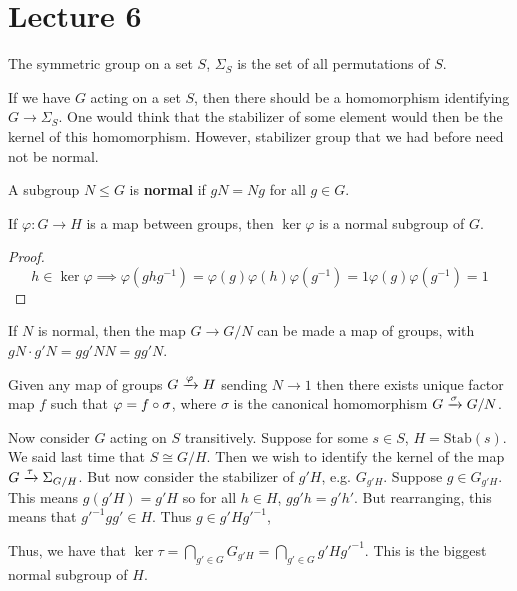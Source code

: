 \section{Lecture 6}
\begin{definition}
    The symmetric group on a set $S$, $\Sigma_S$ is the set of all permutations of $S$.
\end{definition}
If we have $G$ acting on a set $S$, then there should be a homomorphism identifying
$G \to \Sigma_S$. One would think that the stabilizer of some element would then be
the kernel of this homomorphism. However, stabilizer group that we had before need not be normal.
\begin{theorem}
    A subgroup $N \le G$ is \textbf{normal} if $gN = Ng$ for all $g \in G$.
\end{theorem}
\begin{theorem}
    If $\varphi: G \to H$ is a map between groups, then $\ker \varphi$ is a normal subgroup of $G$.
    \begin{proof}
        \[ h \in \ker \varphi \implies \varphi(ghg^{-1}) = \varphi(g) \varphi(h) \varphi(g^{-1}) = 1 \varphi(g) \varphi(g^{-1}) = 1 \]
    \end{proof}
\end{theorem}
\begin{theorem}
    If $N$ is normal, then the map $G \to G/N$ can be made a map of groups,
    with $gN \cdot g'N = gg' NN = gg' N$.
\end{theorem}
\begin{theorem}
    Given any map of groups $G \xrightarrow{\varphi} H$ sending $N \to 1$ then there exists unique factor map $f$ such that
    $\varphi = f \circ \sigma$, where $\sigma$ is the canonical homomorphism $G \xrightarrow{\sigma} G/N$.
\end{theorem}
Now consider $G$ acting on $S$ transitively. Suppose for some $s \in S$, $H = \text{Stab}(s)$.
We said last time that $S \cong G/H$. Then we wish to identify the kernel of the map
$G \xrightarrow{\tau} \Sigma_{G/H}$. But now consider the stabilizer
of $g'H$, e.g. $G_{g'H}$.
Suppose $g \in G_{g'H}$. This means $g(g'H) = g'H$ so for all $h \in H$,
$gg' h = g'h'$. But rearranging, this means that $g'^{-1} g g' \in H$. Thus $g \in g' H g'^{-1}$,

Thus, we have that $\ker \tau = \bigcap_{g' \in G} G_{g'H} = \bigcap_{g' \in G} g' H g'^{-1}$. This is the biggest normal subgroup of $H$.

